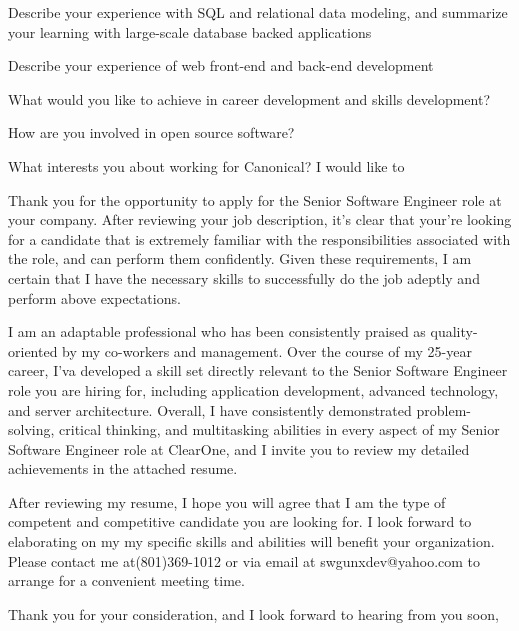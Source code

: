 \documentclass[11pt, a4paper]{awesome-cv}
\begin{document}
Describe your experience with SQL and relational data modeling, and summarize your learning with large-scale database backed applications

Describe your experience of web front-end and back-end development 


What would you like to achieve in career development and skills development?

How are you involved in open source software?


What interests you about working for Canonical?
I would like to 


\begin{cvletter}
Thank you for the opportunity to apply for the Senior Software Engineer role at your company. After reviewing your job description, it's clear that your're looking for a candidate that is extremely familiar with the responsibilities associated with the role, and can perform them confidently. Given these requirements, I am certain that I have the necessary skills to successfully do the job adeptly and perform above expectations.

I am an adaptable professional who has been consistently praised as quality-oriented by my co-workers and management. Over the course of my 25-year career, I'va developed a skill set directly relevant to the Senior Software Engineer  role you are hiring for, including application development, advanced technology, and server architecture. Overall, I have consistently demonstrated problem-solving, critical thinking, and multitasking abilities in every aspect of my Senior Software Engineer role at ClearOne, and I invite you to review my detailed achievements in the attached resume.


After reviewing my resume, I hope you will agree that I am the type of competent and competitive candidate you are looking for. I look forward to elaborating on my my specific skills and abilities will benefit your organization. Please contact me at(801)369-1012 or via email at swgunxdev@yahoo.com to arrange for a convenient meeting time.

Thank you for your consideration, and I look forward to hearing from you soon,

\end{cvletter}

\makeletterclosing
\end{document}
